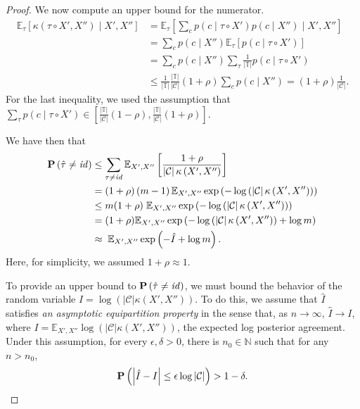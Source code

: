 \begin{proof}
We now compute an upper bound for the numerator.
%
\begin{align*}
\mathbb{E}_\tau \left[\kappa\left(\tau \circ X', X''\right) \mid X', X''\right]
&= \mathbb{E}_\tau \left[\sum_c p(c \mid \tau \circ X') p(c \mid X'') \mid X', X''\right]\\
&= \sum_c p(c \mid X'') \mathbb{E}_\tau \left[p(c \mid \tau \circ X')\right]\\
&= \sum_c p(c \mid X'') \sum_\tau \frac{1}{\left|\mathbb{T}\right|} p(c \mid \tau \circ X')\\
&\leq \frac{1}{\left|\mathbb{T}\right|}\frac{\left|\mathbb{T}\right|}{\left|\mathcal{C}\right|}(1 + \rho)\sum_c p(c \mid X'') = (1 + \rho)\frac{1}{\left|\mathcal{C}\right|}.
\end{align*}
%
For the last inequality, we used the assumption that $\sum_{\tau} p(c \mid \tau \circ X') \in \left[\frac{\left|\mathbb{T}\right|}{\left|\mathcal{C}\right|}(1 - \rho), \frac{\left|\mathbb{T}\right|}{\left|\mathcal{C}\right|}(1 + \rho)\right]$.

We have then that
%
\begin{align*}
\mathbf{P}\left(\hat{\tau} \neq \mathit{id}\right) &\leq \sum_{\tau \neq \mathit{id}} \mathbb{E}_{X', X''}\left[\frac{1 + \rho}{\left|\mathcal{C}\right|\kappa\left(X', X''\right)}\right]\\
&= (1 + \rho)\left(m - 1\right) \mathbb{E}_{X', X''}\exp\left(-\log\left(\left|\mathcal{C}\right|\kappa\left(X', X''\right)\right)\right)\\
&\leq m (1 + \rho) \; \mathbb{E}_{X', X''}\exp\left(-\log\left(\left|\mathcal{C}\right|\kappa\left(X', X''\right)\right)\right)\\
&= (1 + \rho)\mathbb{E}_{X', X''}\exp\left(-\log\left(\left|\mathcal{C}\right|\kappa\left(X', X''\right)\right) + \log m\right)\\
&\approx \; \mathbb{E}_{X', X''}\exp\left(-\hat{I} + \log m\right).
\end{align*}
%
Here, for simplicity, we assumed $1 + \rho \approx 1$.

To provide an upper bound to $\mathbf{P}\left(\hat{\tau} \neq \mathit{id}\right)$, we must bound the behavior of the random variable $\hat{I} = \log\left(\left|\mathcal{C}\right|\kappa\left(X', X''\right)\right)$. To do this, we assume that $\hat{I}$ satisfies \emph{an asymptotic equipartition property} in the sense that, as $n \to \infty$, $\hat{I} \to I$, where $I = \mathbb{E}_{X', X''}\log\left(\left|\mathcal{C}\right|\kappa\left(X', X''\right)\right)$, the expected log posterior agreement. Under this assumption, for every $\epsilon, \delta > 0$, there is $n_0 \in \mathbb{N}$ such that for any $n > n_0$,
%
$$\mathbf{P}\left(\left|\hat{I} - I\right| \leq \epsilon \log \left|\mathcal{C}\right|\right) > 1 - \delta.$$
%


\end{proof}
